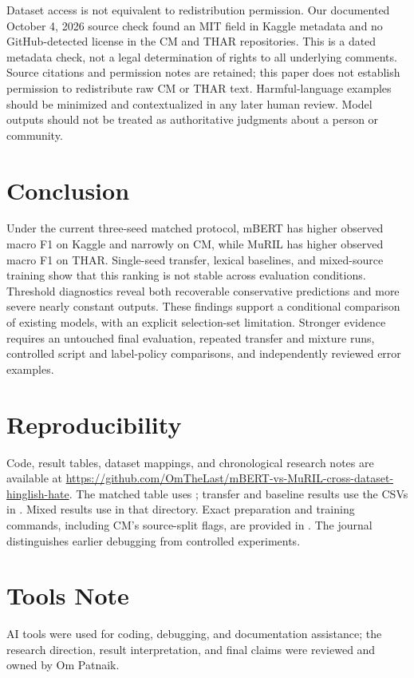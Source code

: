 \documentclass[11pt,a4paper]{article}
\begin{document}
Dataset access is not equivalent to redistribution permission. Our
documented October 4, 2026 source check found an MIT field in Kaggle
metadata and no GitHub-detected license in the CM and THAR repositories.
This is a dated metadata check, not a legal determination of rights to
all underlying comments. Source citations and permission notes are
retained; this paper does not establish permission to redistribute raw
CM or THAR text. Harmful-language examples should be minimized and
contextualized in any later human review. Model outputs should not be
treated as authoritative judgments about a person or community.

\section{Conclusion}
Under the current three-seed matched protocol, mBERT has higher observed
macro F1 on Kaggle and narrowly on CM, while MuRIL has higher observed
macro F1 on THAR. Single-seed transfer, lexical baselines, and mixed-source
training show that this ranking is not stable across evaluation conditions.
Threshold diagnostics reveal both recoverable conservative predictions
and more severe nearly constant outputs. These findings support a
conditional comparison of existing models, with an explicit selection-set
limitation. Stronger evidence requires an untouched final evaluation,
repeated transfer and mixture runs, controlled script and label-policy
comparisons, and independently reviewed error examples.

\section*{Reproducibility}
Code, result tables, dataset mappings, and chronological research notes
are available at
\url{https://github.com/OmTheLast/mBERT-vs-MuRIL-cross-dataset-hinglish-hate}.
The matched table uses
; transfer and
baseline results use the CSVs in .
Mixed results use  in that
directory. Exact preparation and training commands, including CM's
source-split flags, are provided in .
The journal distinguishes earlier debugging from controlled experiments.

\section*{Tools Note}
AI tools were used for coding, debugging, and documentation assistance; the research direction, result interpretation, and final claims were reviewed and owned by Om Patnaik.
\end{document}
